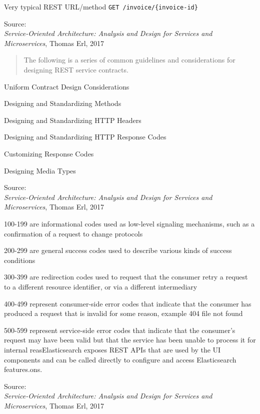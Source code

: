 \documentclass[Screen16to9,17pt]{foils}
\begin{document}



\begin{list2}
\item Very typical REST URL/method \verb+GET /invoice/{invoice-id}+
\end{list2}
Source: {\footnotesize\\
\emph{Service‑Oriented Architecture: Analysis and Design for Services and Microservices}, Thomas Erl, 2017}




\slide{}


\begin{quote}
The following is a series of common guidelines and considerations for designing REST service contracts.
\end{quote}


\begin{list2}
\item Uniform Contract Design Considerations
\item Designing and Standardizing Methods
\item Designing and Standardizing HTTP Headers
\item Designing and Standardizing HTTP Response Codes
\item Customizing Response Codes
\item Designing Media Types
\end{list2}
Source: {\footnotesize\\
\emph{Service‑Oriented Architecture: Analysis and Design for Services and Microservices}, Thomas Erl, 2017}



\begin{list2}
\item 100-199 are informational codes used as low-level signaling mechanisms, such as a confirmation of a request to change protocols
\item 200-299 are general success codes used to describe various kinds of success conditions
\item 300-399 are redirection codes used to request that the consumer retry a request to a different resource identifier, or via a different intermediary
\item 400-499 represent consumer-side error codes that indicate that the consumer has produced a request that is invalid for some reason, example 404 file not found
\item 500-599 represent service-side error codes that indicate that the consumer’s request may have been valid but that the service has been unable to process it for internal reasElasticsearch exposes REST APIs that are used by the UI components and can be called directly to configure and access Elasticsearch features.ons.
\end{list2}
Source: {\footnotesize\\
\emph{Service‑Oriented Architecture: Analysis and Design for Services and Microservices}, Thomas Erl, 2017}
\end{document}
